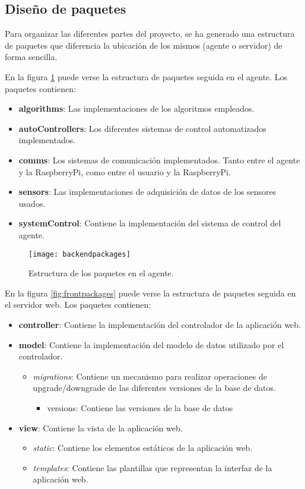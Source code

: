 \subsection{Diseño de paquetes}

Para organizar las diferentes partes del proyecto, se ha generado una estructura de paquetes que diferencia la ubicación de los mismos (agente o servidor) de forma sencilla.

En la figura \ref{fig:backpackages} puede verse la estructura de paquetes seguida en el agente. Los paquetes contienen: 
\begin{itemize}
\item \textbf{algorithms}: Las implementaciones de los algoritmos empleados. 
\item \textbf{autoControllers}: Los diferentes sistemas de control automatizados implementados. 
\item \textbf{comms}: Los sistemas de comunicación implementados. Tanto entre el agente y la RaspberryPi, como entre el usuario y la RaspberryPi.
\item \textbf{sensors}: Las implementaciones de adquisición de datos de los sensores usados.
\item \textbf{systemControl}: Contiene la implementación del sistema de control del agente.
\end{itemize}

\begin{figure}
	\centering
	\texttt{[image: backendpackages]}
	\caption[Estructura de paquetes en agente]{Estructura de los paquetes en el agente.}\label{fig:backpackages}
\end{figure}

En la figura \ref{fig:frontpackages} puede verse la estructura de paquetes seguida en el servidor web. Los paquetes contienen: 
\begin{itemize}
\item \textbf{controller}: Contiene la implementación del controlador de la aplicación web.
\item \textbf{model}: Contiene la implementación del modelo de datos utilizado por el controlador.
\begin{itemize}
\item \textit{migrations}: Contiene un mecanismo para realizar operaciones de upgrade/downgrade de las diferentes versiones de la base de datos.
\begin{itemize}
\item versions: Contiene las versiones de la base de datos
\end{itemize}
\end{itemize}
\item \textbf{view}: Contiene la vista de la aplicación web.
\begin{itemize}
\item \textit{static}: Contiene los elementos estáticos de la aplicación web.
\item \textit{templates}: Contiene las plantillas que representan la interfaz de la aplicación web.
\end{itemize}
\end{itemize}

